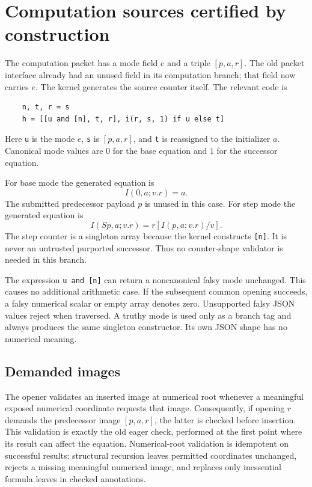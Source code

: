 \section{Computation sources certified by construction}
\label{sec:constructed-supply-audit}

The computation packet has a mode field $e$ and a triple $[p,a,r]$.
The old packet interface already had an unused field in its computation
branch; that field now carries $e$.  The kernel generates the source
counter itself.  The relevant code is
\begin{verbatim}
    n, t, r = s
    h = [[u and [n], t, r], i(r, s, 1) if u else t]
\end{verbatim}
Here \texttt{u} is the mode $e$, \texttt{s} is $[p,a,r]$, and
\texttt{t} is reassigned to the initializer $a$.  Canonical mode values
are $0$ for the base equation and $1$ for the successor equation.

For base mode the generated equation is
\[
                 I(0,a;v.r)=a.
\]
The submitted predecessor payload $p$ is unused in this case.  For step
mode the generated equation is
\[
                 I(Sp,a;v.r)=r[I(p,a;v.r)/v].
\]
The step counter is a singleton array because the kernel constructs
\texttt{[n]}.  It is never an untrusted purported successor.  Thus no
counter-shape validator is needed in this branch.

The expression \texttt{u and [n]} can return a noncanonical falsy mode
unchanged.  This causes no additional arithmetic case.  If the subsequent
common opening succeeds, a falsy numerical scalar or empty array denotes
zero.  Unsupported falsy JSON values reject when traversed.  A truthy
mode is used only as a branch tag and always produces the same singleton
constructor.  Its own JSON shape has no numerical meaning.

\subsection{Demanded images}

The opener validates an inserted image at numerical root whenever a
meaningful exposed numerical coordinate requests that image.  Consequently,
if opening $r$ demands the predecessor image $[p,a,r]$, the latter is
checked before insertion.  This validation is exactly the old eager
check, performed at the first point where its result can affect the
equation.  Numerical-root validation is idempotent on successful results:
structural recursion leaves permitted coordinates unchanged, rejects a
missing meaningful numerical image, and replaces only inessential
formula leaves in checked annotations.


